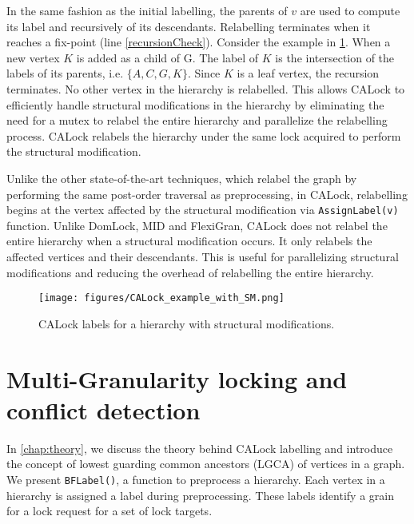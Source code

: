 In the same fashion as the initial labelling, the parents of $v$ are used to compute its label and recursively of its descendants. Relabelling terminates when it reaches a fix-point (line \ref{recursionCheck}). 
Consider the example in \cref{fig:CAstructuralModification}. When a new vertex $K$ is added as a child of G. The label of $K$ is the intersection of the labels of its parents, i.e. $\{A, C, G, K\}$. Since $K$ is a leaf vertex, the recursion terminates. 
No other vertex in the hierarchy is relabelled. 
This allows CALock to efficiently handle structural modifications in the hierarchy by eliminating the need for a mutex to relabel the entire hierarchy and parallelize the relabelling process. CALock relabels the hierarchy under the same lock acquired to perform the structural modification.

Unlike the other state-of-the-art techniques, which relabel the graph by performing the same post-order traversal as preprocessing, in CALock, relabelling begins at the vertex affected by the structural modification via \lstinline|AssignLabel(v)| function. 
Unlike DomLock, MID and FlexiGran, CALock does not relabel the entire hierarchy when a structural modification occurs. 
It only relabels the affected vertices and their descendants. 
This is useful for parallelizing structural modifications and reducing the overhead of relabelling the entire hierarchy.

\begin{figure}
	\centering
	\captionsetup{justification=centering}
	\texttt{[image: figures/CALock\_example\_with\_SM.png]}
	\caption{CALock labels for a hierarchy with structural modifications.}
	\label{fig:CAstructuralModification}
\end{figure}







\section{Multi-Granularity locking and conflict detection} \label{chap:calock}


In \cref{chap:theory}, we discuss the theory behind CALock labelling and introduce the concept of lowest guarding common ancestors (LGCA) of vertices in a graph. We present \lstinline|BFLabel()|, a function to preprocess a hierarchy. Each vertex in a hierarchy is assigned a label during preprocessing. These labels identify a grain for a lock request for a set of lock targets. 


